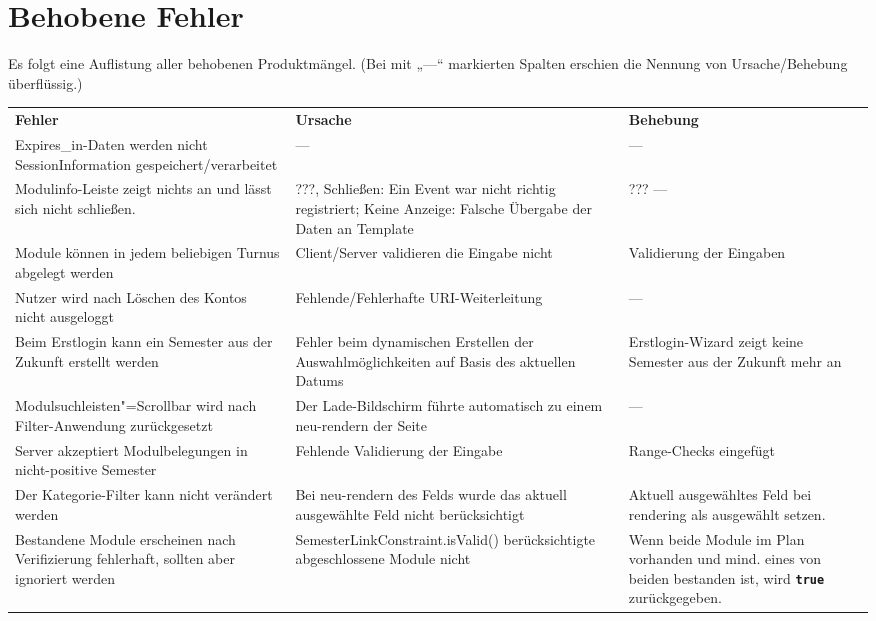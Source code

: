 \FloatBarrier
\section{Behobene Fehler}

Es folgt eine Auflistung aller behobenen Produktmängel. (Bei mit „---“ markierten Spalten erschien die Nennung von Ursache/Behebung überflüssig.)


\begin{longtable}{| >{\hspace{0pt}} p{} | >{\hspace{0pt}} p{} | >{\hspace{0pt}} p{} | }
	\hline
	\textbf{Fehler} & \textbf{Ursache}  & \textbf{Behebung} \\ 
	\hhline{|=|=|=|}
	\endfirsthead
	\endhead
	Expires\_in-Daten werden nicht SessionInformation gespeichert/verarbeitet & --- & --- \\
	\hline
	Modulinfo-Leiste zeigt nichts an und lässt sich nicht schließen. & ???, Schließen: Ein Event war nicht richtig registriert; Keine Anzeige: Falsche Übergabe der Daten an Template & ??? --- \\
	\hline
	Module können in jedem beliebigen Turnus abgelegt werden & Client/Server validieren die Eingabe nicht & Validierung der Eingaben \\
	\hline
	Nutzer wird nach Löschen des Kontos nicht ausgeloggt & Fehlende/Fehlerhafte URI-Weiterleitung & --- \\
	\hline
	Beim Erstlogin kann ein Semester aus der Zukunft erstellt werden & Fehler beim dynamischen Erstellen der Auswahlmöglichkeiten auf Basis des aktuellen Datums & Erstlogin-Wizard zeigt keine Semester aus der Zukunft mehr an \\
	\hline
	Modulsuchleisten"=Scrollbar wird nach Filter-Anwendung zurückgesetzt & Der Lade-Bildschirm führte automatisch zu einem neu-rendern der Seite & --- \\
	\hline
	Server akzeptiert Modulbelegungen in nicht-positive Semester & Fehlende Validierung der Eingabe & Range-Checks eingefügt \\
	\hline
	Der Kategorie-Filter kann nicht verändert werden & Bei neu-rendern des Felds wurde das aktuell ausgewählte Feld nicht berücksichtigt & Aktuell ausgewähltes Feld bei rendering als ausgewählt setzen. \\
	\hline
	Bestandene Module erscheinen nach Verifizierung fehlerhaft, sollten aber ignoriert werden & SemesterLinkConstraint.isValid() berücksichtigte abgeschlossene Module nicht & Wenn beide Module im Plan vorhanden und mind. eines von beiden bestanden ist, wird \texttt{\textbf{true}} zurückgegeben. \\

\end{longtable}
